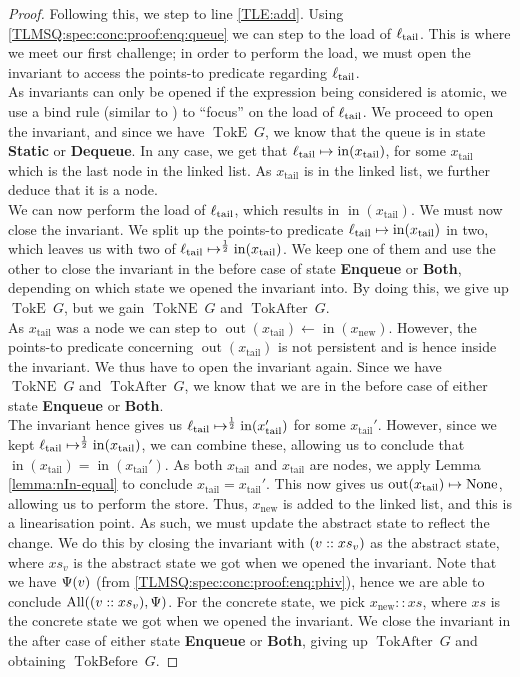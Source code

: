 \documentclass[a4paper, 10pt]{report}
\theoremstyle{definition}
\newcommand{\xsc}{xs}
\newcommand{\AllP}{\operatorname{All}}
\newcommand{\locN}[1]{\loc_{\mathrm{#1}}}
\newcommand{\loctail}{\locN{tail}}
\newcommand{\nIn}[1]{\operatorname{in}(#1)}
\newcommand{\nOut}[1]{\operatorname{out}(#1)}
\newcommand{\node}{x}
\newcommand{\nodeN}[1]{\node_{\mathrm{#1}}}
\newcommand{\nodetail}{\nodeN{tail}}
\newcommand{\nodenew}{\nodeN{new}}
\newcommand{\absvalue}{\val}
\newcommand{\absvalueList}{xs_v}
\newcommand{\StaticState}{\textbf{Static}\xspace}
\newcommand{\EnqueueState}{\textbf{Enqueue}\xspace}
\newcommand{\DequeueState}{\textbf{Dequeue}\xspace}
\newcommand{\BothState}{\textbf{Both}\xspace}
\newcommand{\Qg}{G}
\newcommand{\TokE}[1]{\operatorname{TokE} ~ #1}
\newcommand{\TokEQg}{\TokE{\Qg}}
\newcommand{\TokNE}[1]{\operatorname{TokNE} ~ #1}
\newcommand{\TokNEQg}{\TokNE{\Qg}}
\newcommand{\TokBefore}[1]{\operatorname{TokBefore} ~ #1}
\newcommand{\TokBeforeQg}{\TokBefore{\Qg}}
\newcommand{\TokAfter}[1]{\operatorname{TokAfter} ~ #1}
\newcommand{\TokAfterQg}{\TokAfter{\Qg}}
\begin{document}
\begin{proof}
Following this, we step to line \ref{TLE:add}. Using \ref{TLMSQ:spec:conc:proof:enq:queue} we can step to the load of $\loctail$. This is where we meet our first challenge; in order to perform the load, we must open the invariant to access the points-to predicate regarding $\loctail$.\\
As invariants can only be opened if the expression being considered is atomic, we use a bind rule (similar to ) to ``focus'' on the load of $\loctail$. We proceed to open the invariant, and since we have $\TokEQg$, we know that the queue is in state \StaticState or \DequeueState. In any case, we get that $\loctail \mapsto \nIn{\nodetail}$, for some $\nodetail$ which is the last node in the linked list. As $\nodetail$ is in the linked list, we further deduce that it is a node.\\
We can now perform the load of $\loctail$, which results in $\nIn{\nodetail}$. We must now close the invariant. We split up the points-to predicate $\loctail \mapsto \nIn{\nodetail}$ in two, which leaves us with two of $\loctail \mapsto^{\frac{1}{2}} \nIn{\nodetail}$. We keep one of them and use the other to close the invariant in the before case of state \EnqueueState or \BothState, depending on which state we opened the invariant into. By doing this, we give up $\TokEQg$, but we gain $\TokNEQg$ and $\TokAfterQg$.\\
As $\nodetail$ was a node we can step to $\nOut{\nodetail} \gets \nIn{\nodenew}$. However, the points-to predicate concerning $\nOut{\nodetail}$ is not persistent and is hence inside the invariant. We thus have to open the invariant again. Since we have $\TokNEQg$ and $\TokAfterQg$, we know that we are in the before case of either state \EnqueueState or \BothState.\\
The invariant hence gives us $\loctail \mapsto^{\frac{1}{2}} \nIn{\nodetail'}$ for some $\nodetail'$. However, since we kept $\loctail \mapsto^{\frac{1}{2}} \nIn{\nodetail}$, we can combine these, allowing us to conclude that $\nIn{\nodetail} = \nIn{\nodetail'}$. As both $\nodetail$ and $\nodetail$ are nodes, we apply Lemma \ref{lemma:nIn-equal} to conclude $\nodetail = \nodetail'$. This now gives us $\nOut{\nodetail} \mapsto \None$, allowing us to perform the store. Thus, $\nodenew$ is added to the linked list, and this is a linearisation point. As such, we must update the abstract state to reflect the change. We do this by closing the invariant with $(\absvalue :: \absvalueList)$ as the abstract state, where $\absvalueList$ is the abstract state we got when we opened the invariant. Note that we have $\Psi(\absvalue)$ (from \ref{TLMSQ:spec:conc:proof:enq:phiv}), hence we are able to conclude $\AllP((\absvalue :: \absvalueList), \Psi)$. For the concrete state, we pick $\nodenew :: \xsc$, where $\xsc$ is the concrete state we got when we opened the invariant. We close the invariant in the after case of either state \EnqueueState or \BothState, giving up $\TokAfterQg$ and obtaining $\TokBeforeQg$.


\end{proof}
\end{document}
